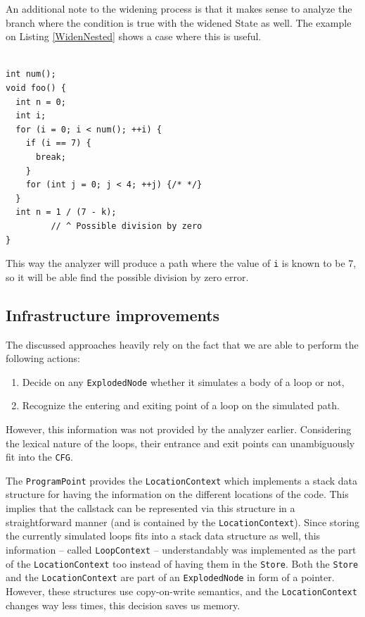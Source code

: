 \documentclass[oneside, a4paper, 12pt]{article}
\theoremstyle{definition}
\begin{document}
An additional note to the widening process is that it makes sense to analyze the branch 
where the condition is true with the widened State as well. The example on 
Listing \ref{WidenNested} shows a case where this is useful.
\\
\\
\begin{lstlisting}
int num();
void foo() {
  int n = 0;
  int i;
  for (i = 0; i < num(); ++i) {
    if (i == 7) {
      break;
    }
    for (int j = 0; j < 4; ++j) {/* */}
  }
  int n = 1 / (7 - k);
         // ^ Possible division by zero
}\end{lstlisting}
This way the analyzer will produce a path where the value of \texttt{i} is 
known
to be 7, so it will be able find the possible division by zero error.
	
\subsection{Infrastructure improvements}\label{sec:inf}
The discussed approaches heavily rely on the fact that we are able to 
perform the following actions:
\begin{enumerate}
	\item Decide on any \texttt{ExplodedNode} whether it simulates a body of a 
	loop or not,
	\item Recognize the entering and exiting point of a loop on the simulated 
	path.
\end{enumerate}

However, this information was not provided by the analyzer earlier. Considering the 
lexical nature of the loops, their entrance and exit points can unambiguously 
fit into the \texttt{CFG}. 

The \texttt{ProgramPoint} provides the \texttt{LocationContext} which implements a stack data structure for having the information on the different locations of the code.  This implies that the callstack can be represented via this structure in a straightforward manner (and is contained by the \texttt{LocationContext}).
Since storing the currently simulated loops fits into a stack data structure as well, this information -- called \texttt{LoopContext} -- understandably was implemented as the part of the \texttt{LocationContext} too instead of having them in the \texttt{Store}. Both the \texttt{Store} and the \texttt{LocationContext} are part of an \texttt{ExplodedNode} in form of a pointer. However, these structures use copy-on-write semantics, and the \texttt{LocationContext} changes way less times, this decision saves us memory. 
\end{document}
